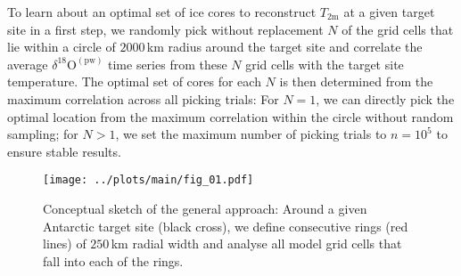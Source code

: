 \documentclass[cp, manuscript]{copernicus}
\begin{document}
To learn about an optimal set of ice cores to reconstruct $T_{2\mathrm{m}}$ at a
given target site in a first step, we randomly pick without replacement $N$ of
the grid cells that lie within a circle of $2000$\,km radius around the target
site and correlate the average $\delta^{18}\mathrm{O}^{\mathrm{(pw)}}$ time
series from these $N$ grid cells with the target site temperature. The optimal
set of cores for each $N$ is then determined from the maximum correlation across
all picking trials: For $N=1$, we can directly pick the optimal location from
the maximum correlation within the circle without random sampling; for $N>1$, we
set the maximum number of picking trials to $n=10^5$ to ensure stable results.

\begin{figure}[t]%
\centering
\texttt{[image: ../plots/main/fig\_01.pdf]}
\caption[Conceptual approach]{%
  Conceptual sketch of the general approach: Around a given Antarctic target
  site (black cross), we define consecutive rings (red lines) of $250$\,km
  radial width and analyse all model grid cells that fall into each of the
  rings.}
\label{fig:concept}%
\end{figure}%


\end{document}
